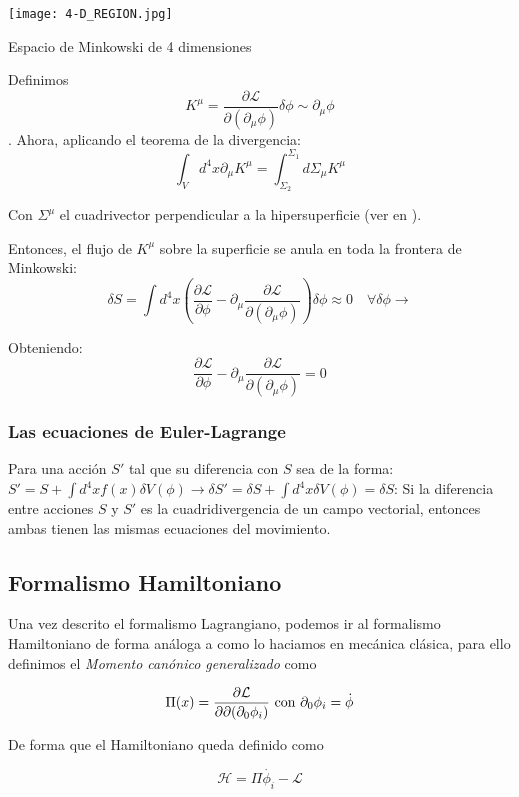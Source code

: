 \begin{marginfigure}[]
  \texttt{[image: 4-D\_REGION.jpg]}
  \caption[]{Espacio de Minkowski de 4 dimensiones}
\end{marginfigure}

Definimos $$K^\mu = \frac{\partial \mathcal{L}}{\partial (\partial_\mu \phi)} \delta \phi \sim \partial_\mu \phi$$. Ahora, aplicando el teorema de la divergencia:
$$
\int_V d^4x \partial_\mu K^\mu = \int_{\Sigma_2}^{\Sigma_1} d\Sigma_\mu K^\mu
$$

Con $\Sigma^\mu$ el cuadrivector perpendicular a la hipersuperficie (ver en ).

Entonces, el flujo de $K^\mu$ sobre la superficie se anula en toda la frontera de Minkowski:
$$
\delta S = \int d^4x \left( \frac{\partial \mathcal{L}}{\partial \phi} - \partial_\mu \frac{\partial \mathcal{L}}{\partial (\partial_\mu \phi)} \right) \delta \phi \approx 0 \quad \forall \delta \phi \rightarrow
$$

Obteniendo:
$$
\frac{\partial \mathcal{L}}{\partial \phi} - \partial_\mu \frac{\partial \mathcal{L}}{\partial (\partial_\mu \phi)} = 0
$$

\subsubsection{Las ecuaciones de Euler-Lagrange}

Para una acción $S'$ tal que su diferencia con $S$ sea de la forma: $S' = S + \int d^4x f(x)\delta V(\phi) \rightarrow \delta S' = \delta S + \int d^4x \delta V(\phi) = \delta S$: Si la diferencia entre acciones $S$ y $S'$ es la cuadridivergencia de un campo vectorial, entonces ambas tienen las mismas ecuaciones del movimiento.
\subsection{Formalismo Hamiltoniano}

Una vez descrito el formalismo Lagrangiano, podemos ir al formalismo Hamiltoniano de forma análoga a como lo haciamos en mecánica clásica, para ello definimos el \textit{Momento canónico generalizado} como 

\[\Pi(x)=\pdv{\mathcal{L}}{\partial(\partial_{0}\phi_{i})}\text{ con }\partial_{0}\phi_{i}= \dot{\phi}\]

De forma que el Hamiltoniano queda definido como 

\[\mathcal{H}=\Pi\dot{\phi_{i}}-\mathcal{L}\]

